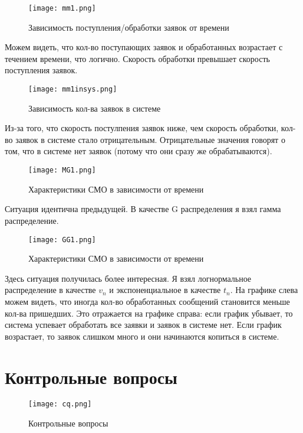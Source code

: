 \begin{figure}[H]
    \centering
    \texttt{[image: mm1.png]}
    \caption{Зависимость поступления/обработки заявок от времени}
\end{figure}

Можем видеть, что кол-во поступающих заявок и обработанных возрастает с течением времени, что логично. Скорость обработки превышает
скорость поступления заявок.

\begin{figure}[H]
    \centering
    \texttt{[image: mm1insys.png]}
    \caption{Зависимость кол-ва заявок в системе}
\end{figure}

Из-за того, что скорость постулпения заявок ниже, чем скорость обработки, кол-во заявок в системе стало отрицательным. Отрицательные
значения говорят о том, что в системе нет заявок (потому что они сразу же обрабатываются).

\begin{figure}[H]
    \centering
    \texttt{[image: MG1.png]}
    \caption{Характеристики СМО в зависимости от времени}
\end{figure}

Ситуация идентична предыдущей. В качестве G распределения я взял гамма распределение.

\begin{figure}[H]
    \centering
    \texttt{[image: GG1.png]}
    \caption{Характеристики СМО в зависимости от времени}
\end{figure}

Здесь ситуация получилась более интересная. Я взял логнормальное распределение в качестве $v_n$ и экспоненциальное в качестве $t_n$.
На графике слева можем видеть, что иногда кол-во обработанных сообщений становится меньше кол-ва пришедших. Это отражается на графике
справа: если график убывает, то система успевает обработать все заявки и заявок в системе нет. Если график возрастает, то заявок
слишком много и они начинаются копиться в системе.

\section*{\textbf{Контрольные вопросы}}

\begin{figure}[H]
    \centering
    \texttt{[image: cq.png]} 
    \caption{Контрольные вопросы}
\end{figure}

